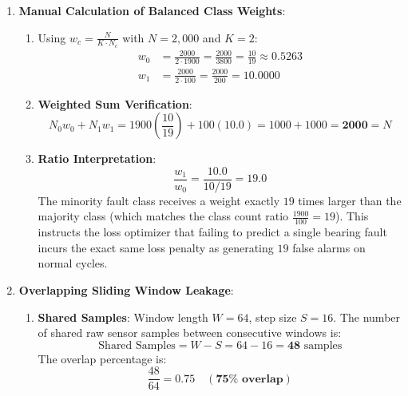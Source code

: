 \begin{enumerate}
    \item \textbf{Manual Calculation of Balanced Class Weights}:
    \begin{enumerate}[label=(\alph*)]
        \item Using $w_c = \frac{N}{K \cdot N_c}$ with $N = 2{,}000$ and $K = 2$:
        \begin{align*}
        w_0 &= \frac{2000}{2 \cdot 1900} = \frac{2000}{3800} = \frac{10}{19} \approx \mathbf{0.5263} \\
        w_1 &= \frac{2000}{2 \cdot 100} = \frac{2000}{200} = \mathbf{10.0000}
        \end{align*}

        \item \textbf{Weighted Sum Verification}:
        \begin{equation*}
        N_0 w_0 + N_1 w_1 = 1900 \left(\frac{10}{19}\right) + 100(10.0) = 1000 + 1000 = \mathbf{2000} = N
        \end{equation*}

        \item \textbf{Ratio Interpretation}:
        \begin{equation*}
        \frac{w_1}{w_0} = \frac{10.0}{10/19} = 19.0
        \end{equation*}
        The minority fault class receives a weight exactly $19$ times larger than the majority class (which matches the class count ratio $\frac{1900}{100} = 19$). This instructs the loss optimizer that failing to predict a single bearing fault incurs the exact same loss penalty as generating $19$ false alarms on normal cycles.
    \end{enumerate}

    \item \textbf{Overlapping Sliding Window Leakage}:
    \begin{enumerate}[label=(\alph*)]
        \item \textbf{Shared Samples}:
        Window length $W = 64$, step size $S = 16$.
        The number of shared raw sensor samples between consecutive windows is:
        \begin{equation*}
        \text{Shared Samples} = W - S = 64 - 16 = \mathbf{48} \text{ samples}
        \end{equation*}
        The overlap percentage is:
        \begin{equation*}
        \frac{48}{64} = 0.75 \quad (\mathbf{75\% \text{ overlap}})
        \end{equation*}


\end{enumerate}
\end{enumerate}
